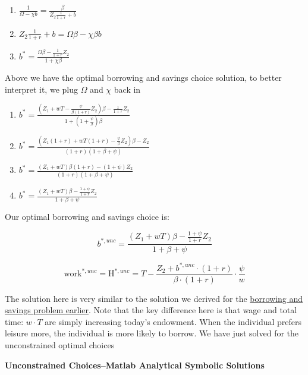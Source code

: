 \documentclass[
]{book}
\begin{document}
\begin{enumerate}
\def\labelenumi{\arabic{enumi}.}
\item
  \(\displaystyle \frac{1}{\Omega -\chi b}=\frac{\beta }{Z_2 \frac{1}{1+r}+b}\)
\item
  \(\displaystyle Z_2 \frac{1}{1+r}+b=\Omega \beta -\chi \beta b\)
\item
  \(\displaystyle b^{\ast } =\frac{\Omega \beta -\frac{1}{1+r}Z_2 }{1+\chi \beta }\)
\end{enumerate}

Above we have the optimal borrowing and savings choice solution, to
better interpret it, we plug \(\Omega\) and \(\chi\) back in

\begin{enumerate}
\def\labelenumi{\arabic{enumi}.}
\item
  \(\displaystyle b^{\ast } =\frac{\left(Z_1 +wT-\frac{\psi }{\beta (1+r)}Z_2 \right)\beta -\frac{1}{1+r}Z_2 }{1+\left(1+\frac{\psi }{\beta }\right)\beta }\)
\item
  \(\displaystyle b^{\ast } =\frac{\left(Z_1 (1+r)+wT(1+r)-\frac{\psi }{\beta }Z_2 \right)\beta -Z_2 }{\left(1+r\right)\left(1+\beta +\psi \right)}\)
\item
  \(\displaystyle b^{\ast } =\frac{\left(Z_1 +wT\right)\beta (1+r)-\left(1+\psi \right)Z_2 }{\left(1+r\right)\left(1+\beta +\psi \right)}\)
\item
  \(\displaystyle b^{\ast } =\frac{\left(Z_1 +wT\right)\beta -\frac{1+\psi }{1+r}Z_2 }{1+\beta +\psi }\)
\end{enumerate}

Our optimal borrowing and savings choice is:

\[b^{\ast ,unc} =\frac{\left(Z_1 +wT\right)\beta -\frac{1+\psi }{1+r}Z_2 }{1+\beta +\psi }\]

\[{\textrm{work}}^{\ast ,unc} ={\textrm{H}}^{\ast ,unc} =T-\frac{Z_2 +b^{\ast ,unc} \cdot (1+r)}{\beta \cdot (1+r)}\cdot \frac{\psi }{w}\]

The solution here is very similar to the solution we derived for the
\href{https://math4econ.github.io/opti_hh_constrained_brsv/household_c1_c2_constrained.html}{borrowing and savings problem
earlier}.
Note that the key difference here is that wage and total time:
\(w\cdot T\) are simply increasing today's endowment. When the individual
prefers leisure more, the individual is more likely to borrow. We have
just solved for the unconstrained optimal choices

\textbf{Unconstrained Choices--Matlab Analytical Symbolic Solutions}
\end{document}
